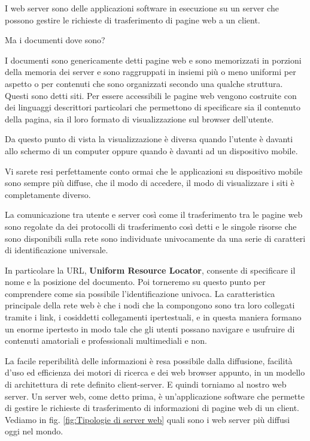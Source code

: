 I web server sono delle applicazioni software in esecuzione su un server che possono gestire le richieste di trasferimento di pagine web a un client. 

Ma i documenti dove sono? 

I documenti sono genericamente detti pagine web e sono memorizzati in porzioni della memoria dei server e sono raggruppati in insiemi più o meno uniformi per aspetto o per contenuti che sono organizzati secondo una qualche struttura. Questi sono detti siti. 
Per essere accessibili le pagine web vengono costruite con dei linguaggi descrittori particolari che permettono di specificare sia il contenuto della pagina, sia il loro formato di visualizzazione sul browser dell'utente.

Da questo punto di vista la visualizzazione è diversa quando l'utente è davanti allo schermo di un computer oppure quando è davanti ad un dispositivo mobile.

Vi sarete resi perfettamente conto ormai che le applicazioni su dispositivo mobile sono sempre più diffuse, che il modo di accedere, il modo di visualizzare i siti è completamente diverso.

La comunicazione tra utente e server così come il trasferimento tra le pagine web sono regolate da dei protocolli di trasferimento così detti e le singole risorse che sono disponibili sulla rete sono individuate univocamente da una serie di caratteri di identificazione universale.

In particolare la URL, \textbf{Uniform Resource Locator}, consente di specificare il nome e la posizione del documento. Poi torneremo su questo punto per comprendere come sia possibile l'identificazione univoca. La caratteristica principale della rete web è che i nodi che la compongono sono tra loro collegati tramite i link, i cosiddetti collegamenti ipertestuali, e in questa maniera formano un enorme ipertesto in modo tale che gli utenti possano navigare e usufruire di contenuti amatoriali e professionali multimediali e non.

La facile reperibilità delle informazioni è resa possibile dalla diffusione, facilità d'uso ed efficienza dei motori di ricerca e dei web browser appunto, in un modello di architettura di rete definito client-server. E quindi torniamo al nostro web server. Un server web, come detto prima, è un'applicazione software che permette di gestire le richieste di trasferimento di informazioni di pagine web di un client. Vediamo in fig. \ref{fig:Tipologie di server web} quali sono i web server più diffusi oggi nel mondo.


